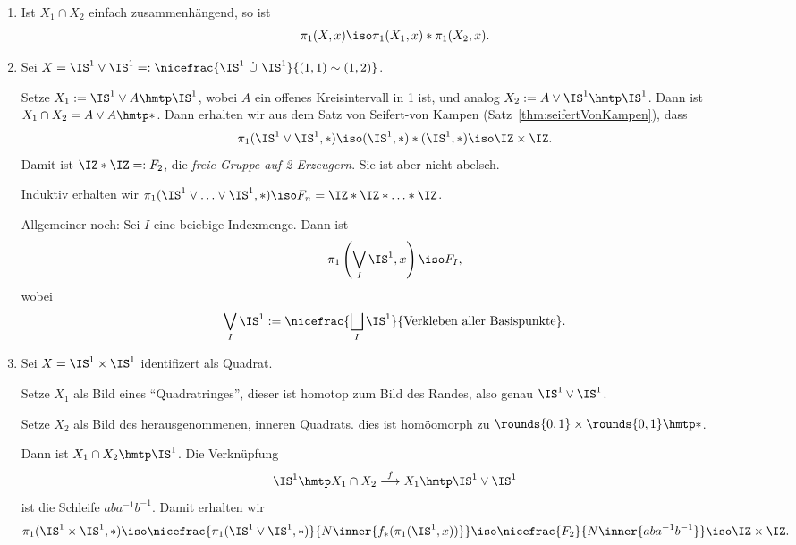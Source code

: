 \documentclass[language=ngerman]{TemplateLecture} %
\begin{document}
\begin{example}
    \begin{enumerate}[$(i)$]
        \item Ist $X_1 \cap X_2$ einfach zusammenhängend, so ist 
        \begin{equation*}
            \pi_1(X,x) \iso \pi_1(X_1, x) * \pi_1(X_2, x).
        \end{equation*}
        \item Sei $X = \IS^1 \vee \IS^1 =: \nicefrac{\IS^1~\dot{\cup}~\IS^1}{(1,1) \sim (1,2)}$.

        Setze $X_1 := \IS^1 \vee A \hmtp \IS^1$, wobei $A$ ein offenes Kreisintervall in 1 ist, und analog $X_2 := A \vee \IS^1 \hmtp \IS^1$. Dann ist $X_1 \cap X_2 = A \vee A \hmtp *$. Dann erhalten wir aus dem Satz von Seifert-von Kampen (Satz~\ref{thm:seifertVonKampen}), dass 
        \begin{equation*}
            \pi_1(\IS^1 \vee \IS^1, *) \iso (\IS^1, *) * (\IS^1, *) \iso \IZ \times \IZ.
        \end{equation*}
        Damit ist $\IZ * \IZ =: F_2$, die \emph{freie Gruppe auf 2 Erzeugern}. Sie ist aber nicht abelsch.

        Induktiv erhalten wir $\pi_1(\IS^1 \vee \ldots \vee \IS^1, *) \iso F_n = \IZ * \IZ * \ldots * \IZ$.

        Allgemeiner noch: Sei $I$ eine beiebige Indexmenge. Dann ist 
        \begin{equation*}
            \pi_1\left(\bigvee_I \IS^1, x\right) \iso F_I,
        \end{equation*}
        wobei 
        \begin{equation*}
            \bigvee_I \IS^1 := \nicefrac{\bigsqcup_I \IS^1}{\text{Verkleben aller Basispunkte}}.
        \end{equation*}

        \item Sei $X = \IS^1 \times \IS^1$ identifizert als Quadrat. 
        
        Setze $X_1$ als Bild eines \enquote{Quadratringes}, dieser ist homotop zum Bild des Randes, also genau $\IS^1 \vee \IS^1$. 

        Setze $X_2$ als Bild des herausgenommenen, inneren Quadrats. dies ist homöomorph zu $\rounds{0,1} \times \rounds{0,1} \hmtp *$. 

        Dann ist $X_1 \cap X_2 \hmtp \IS^1$. Die Verknüpfung
        \begin{equation*}
            \IS^1 \hmtp X_1 \cap X_2 \overset{f}{\longrightarrow} X_1 \hmtp \IS^1 \vee \IS^1
        \end{equation*}
        ist die Schleife $a b a^{-1} b^{-1}$. Damit erhalten wir 
        \begin{equation*}
            \pi_1(\IS^1 \times \IS^1, *) \iso \nicefrac{\pi_1(\IS^1 \vee \IS^1, *)}{N\inner{f_*(\pi_1(\IS^1, x))}} \iso \nicefrac{F_2}{N\inner{a b a^{-1} b^{-1}}} \iso \IZ \times \IZ.
        \end{equation*}
        

\end{enumerate}
\end{example}
\end{document}
